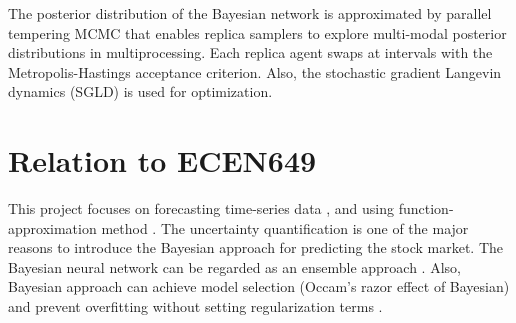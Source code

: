 \documentclass[a4paper]{article}
\begin{document}
The posterior distribution of the Bayesian network is approximated by parallel tempering MCMC that enables replica samplers to explore multi-modal posterior distributions in multiprocessing\cite{chandra2019langevin, chandra2021bayesian}. Each replica agent swaps at intervals with the Metropolis-Hastings acceptance criterion. Also, the stochastic gradient Langevin dynamics (SGLD) is used for optimization.


\section{Relation to ECEN649}

This project focuses on forecasting time-series data \cite[Ch. 11]{braga2020fundamentals}, and using function-approximation method \cite[Ch. 6]{braga2020fundamentals}. The uncertainty quantification \cite[Ch. 7]{braga2020fundamentals} is one of the major reasons to introduce the Bayesian approach \cite[Ch. 2]{braga2020fundamentals} for predicting the stock market. The Bayesian neural network can be regarded as an ensemble approach \cite[Ch. 3.5]{braga2020fundamentals}. Also, Bayesian approach can achieve model selection (Occam's razor effect of Bayesian) \cite[Ch. 8]{braga2020fundamentals} and prevent overfitting without setting regularization terms \cite[Ch. 6]{braga2020fundamentals}.
\end{document}
